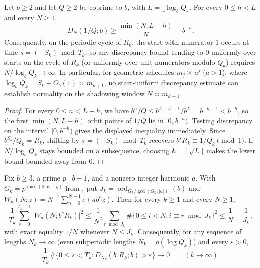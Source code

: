 \documentclass[11pt]{article}
\DeclareMathOperator{\ord}{ord}
\begin{document}
\begin{proposition}\label{prop:worst-start}
Let $b\ge2$ and let $Q\ge2$ be coprime to $b$, with $L=\lfloor\log_b Q\rfloor$. For every $0\le h<L$ and every $N\ge1$,
\[
D_N(1/Q;b)\ge\frac{\min(N,L-h)}{N}-b^{-h}.
\]
Consequently, on the periodic cycle of $R_k$, the start with numerator $1$ occurs at time $s=(-S_k)\bmod T_k$, so any discrepancy bound tending to $0$ uniformly over starts on the cycle of $R_k$ (or uniformly over unit numerators modulo $Q_k$) requires $N/\log_b Q_k\to\infty$. In particular, for geometric schedules $m_j\asymp a^j$ ($a>1$), where $\log_b Q_k=S_k+O_b(1)\asymp m_{k+1}$, no start-uniform discrepancy estimate can establish normality on the shadowing window $N\asymp m_{k+1}$.
\end{proposition}

\begin{proof}
For every $0\le n<L-h$, we have $b^n/Q\le b^{L-h-1}/b^L=b^{-h-1}<b^{-h}$, so the first $\min(N,L-h)$ orbit points of $1/Q$ lie in $[0,b^{-h})$. Testing discrepancy on the interval $[0,b^{-h})$ gives the displayed inequality immediately. Since $b^{S_k}/Q_k=R_k$, shifting by $s=(-S_k)\bmod T_k$ recovers $b^s R_k\equiv 1/Q_k\pmod1$. If $N/\log_b Q_k$ stays bounded on a subsequence, choosing $h=\lfloor\sqrt L\rfloor$ makes the lower bound bounded away from $0$.
\end{proof}

\begin{proposition}\label{prop:short-avg}
Fix $b\ge3$, a prime $p\mid b-1$, and a nonzero integer harmonic $a$. With $G_k=p^{\max(0,E-g)}$ from , put $J_k=\ord_{G_k/\gcd(G_k,|a|)}(b)$ and $W_a(N;z)=N^{-1}\sum_{n=0}^{N-1}e(ab^nz)$. Then for every $k\ge1$ and every $N\ge1$,
\begin{equation}\label{eq:short-avg}
\frac{1}{T_k}\sum_{s=0}^{T_k-1}\bigl|W_a(N;b^sR_k)\bigr|^2
\le\frac{1}{N^2}\sum_{r\bmod J_k}\#\{0\le i<N:i\equiv r\bmod J_k\}^2
\le\frac1N+\frac1{J_k},
\end{equation}
with exact equality $1/N$ whenever $N\le J_k$. Consequently, for any sequence of lengths $N_k\to\infty$ (even subperiodic lengths $N_k=o(\log Q_k)$) and every $\varepsilon>0$,
\[
\frac{1}{T_k}\#\bigl\{0\le s<T_k:D_{N_k}(b^sR_k;b)>\varepsilon\bigr\}\longrightarrow0\qquad(k\to\infty).
\]
\end{proposition}
\end{document}
